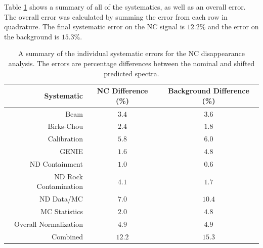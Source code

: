 Table \ref{tab:SystSummary} shows a summary of all of the systematics, as well as an overall error. The overall error was calculated by summing the error from each row in quadrature. The final systematic error on the NC signal is $12.2\%$ and the error on the background is $15.3\%$.
\begin{table}[htb]
  \begin{center}
    \begin{tabular}{r c c}
      \hline\hline
      Systematic & NC Difference (\%) & Background Difference (\%) \\
      \hline
      Beam & $3.4$ & $3.6$ \\
      Birks-Chou & $2.4$ & $1.8$ \\
      Calibration & $5.8$ & $6.0$ \\
      GENIE & $1.6$ & $4.8$ \\
      ND Containment & $1.0$ & $0.6$ \\
      ND Rock Contamination & $4.1$ & $1.7$ \\
      ND Data/MC & $7.0$ & $10.4$ \\
      MC Statistics & $2.0$ & $4.8$ \\
      Overall Normalization & $4.9$ & $4.9$ \\
      \hline
      Combined & $12.2$ & $15.3$ \\
      \hline
    \end{tabular}
    \caption[Systematic Error Summary]{A summary of the individual systematic errors for the NC disappearance analysis. The errors are percentage differences between the nominal and shifted predicted spectra.}
    \label{tab:SystSummary}
  \end{center}
\end{table}

